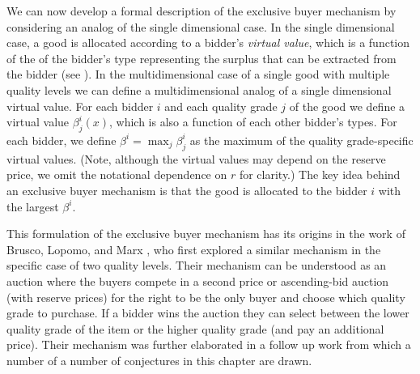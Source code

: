 \documentclass{article}
\begin{document}
We can now develop a formal description of the exclusive buyer mechanism by considering an analog of the single dimensional case. In the single dimensional case, a good is allocated according to a bidder's \textit{virtual value}, which is a function of the of the bidder's type representing the surplus that can be extracted from the bidder (see \cite{myerson1981optimal}). In the multidimensional case of a single good with multiple quality levels we can define a multidimensional analog of a single dimensional virtual value. For each bidder $i$ and each quality grade $j$ of the good we define a virtual value $\beta_j^i(x)$, which is also a function of each other bidder's types. For each bidder, we define $\beta^i = \max_j \beta_j^i$ as the maximum of the quality grade-specific virtual values. (Note, although the virtual values may depend on the reserve price, we omit the notational dependence on $r$ for clarity.) The key idea behind an exclusive buyer mechanism is that the good is allocated to the bidder $i$ with the largest $\beta^i$.

This formulation of the exclusive buyer mechanism has its origins in the work of Brusco, Lopomo, and Marx \autocite*{brusco2011}, who first explored a similar mechanism in the specific case of two quality levels. Their mechanism can be understood as an auction where the buyers compete in a second price or ascending-bid auction (with reserve prices) for the right to be the only buyer and choose which quality grade to purchase. If a bidder wins the auction they can select between the lower quality grade of the item or the higher quality grade (and pay an additional price). Their mechanism was further elaborated in a follow up work \autocite{belloni2010multidimensional} from which a number of a number of conjectures in this chapter are drawn. 
\end{document}
